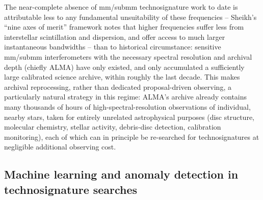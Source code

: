 \documentclass{openjournal}
\begin{document}
The near-complete absence of mm/submm technosignature work to date is
attributable less to any fundamental unsuitability of these frequencies -- Sheikh's
``nine axes of merit'' framework \citep{Sheikh2020} notes that higher frequencies
suffer less from interstellar scintillation and dispersion, and offer access to
much larger instantaneous bandwidths -- than to historical circumstance:
sensitive mm/submm interferometers with the necessary spectral resolution and
archival depth (chiefly ALMA) have only existed, and only accumulated a
sufficiently large calibrated science archive, within roughly the last decade.
This makes archival reprocessing, rather than dedicated proposal-driven
observing, a particularly natural strategy in this regime: ALMA's archive already
contains many thousands of hours of high-spectral-resolution observations of
individual, nearby stars, taken for entirely unrelated astrophysical purposes
(disc structure, molecular chemistry, stellar activity, debris-disc detection,
calibration monitoring), each of which can in principle be re-searched for
technosignatures at negligible additional observing cost.

\subsection{Machine learning and anomaly detection in technosignature searches}
\label{sec:ml}
\end{document}
